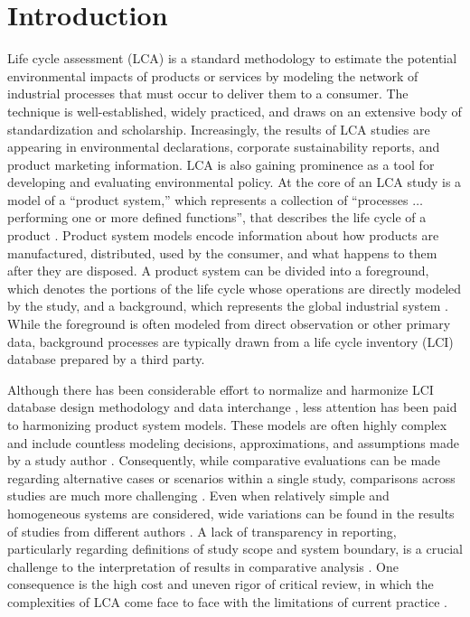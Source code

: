 \section{Introduction}

Life cycle assessment (LCA) is a standard methodology to estimate the potential environmental impacts of products or services by modeling the network of industrial processes that must occur to deliver 
them to a consumer.  The technique is well-established, widely practiced, and draws on an extensive body of standardization and scholarship.
Increasingly, the results of LCA studies are appearing in environmental declarations, corporate sustainability reports, and product marketing information.  LCA is also gaining prominence as a tool for developing and evaluating environmental policy.  
%
At the core of an LCA study is a model of a ``product system,'' which represents a collection of ``processes $\ldots$ performing one or more defined functions'', that describes the life cycle of a product \citep{iso14044}.  Product system models encode information about how products are manufactured, distributed, used by the consumer, and what happens to them after they are disposed.  A product system can be divided into a foreground, which denotes the portions of the life cycle whose operations are directly modeled by the study, and a background, which represents the global industrial system \citep{SETAC_inventory_1998}.  While the foreground is often modeled from direct observation or other primary data, background processes are typically drawn from a life cycle inventory (LCI) database prepared by a third party.

Although there has been considerable effort to normalize and harmonize 
LCI database design methodology and data interchange \citep{UNEP_2011, JRC_ILCD_ELCD_2013, Mila_e_Canals_2015, Ingwersen_JLCA_2015}, less attention has been paid to harmonizing product system models.  These models are often highly complex and include countless modeling decisions, approximations, and assumptions made by a study author \citep{Lloyd2007, reap2008_I}.  Consequently, while comparative evaluations can be made regarding alternative cases or scenarios within a single study, comparisons across studies are much more challenging \citep{Heath2012, Henriksson2014}.  Even when relatively simple and homogeneous systems are considered, wide variations can be found in the results of studies from different authors \citep{van_der_Harst_2013, Turconi_2013}.
A lack of transparency in reporting, particularly regarding definitions of study scope and system boundary,
is a crucial challenge to the interpretation of results in comparative analysis \citep{Cleary2009, Laurent_2014}.
One consequence is the high cost and uneven rigor of critical review, in which the complexities of LCA come face to face with the limitations of current practice \citep{Curran2014}.  


